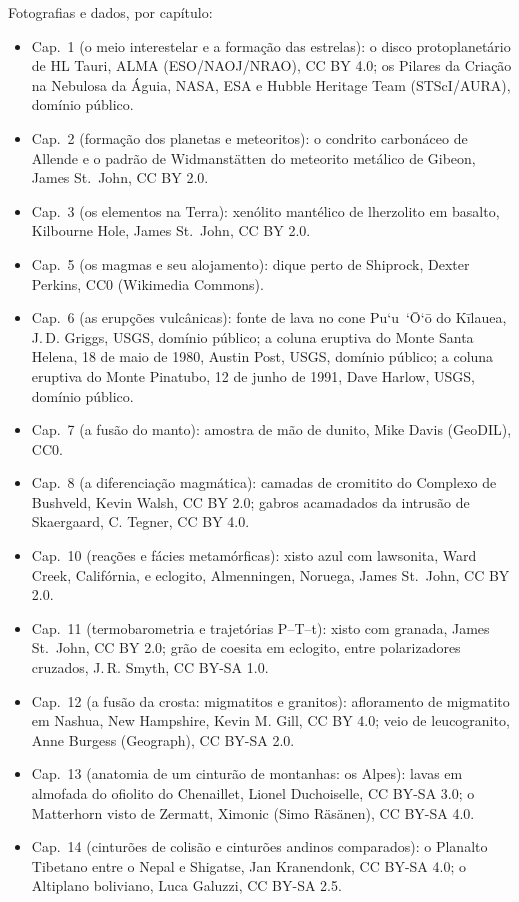 \bigskip
\noindent Fotografias e dados, por capítulo:
\begin{itemize}\small
  \item Cap.~1 (o meio interestelar e a formação das estrelas): o disco protoplanetário de HL Tauri, ALMA (ESO/NAOJ/NRAO), CC BY 4.0; os Pilares da Criação na Nebulosa da Águia, NASA, ESA e Hubble Heritage Team (STScI/AURA), domínio público.
  \item Cap.~2 (formação dos planetas e meteoritos): o condrito carbonáceo de Allende e o padrão de Widmanstätten do meteorito metálico de Gibeon, James St.~John, CC BY 2.0.
  \item Cap.~3 (os elementos na Terra): xenólito mantélico de lherzolito em basalto, Kilbourne Hole, James St.~John, CC BY 2.0.
  \item Cap.~5 (os magmas e seu alojamento): dique perto de Shiprock, Dexter Perkins, CC0 (Wikimedia Commons).
  \item Cap.~6 (as erupções vulcânicas): fonte de lava no cone Pu`u~`\=O`\=o do Kīlauea, J.\,D. Griggs, USGS, domínio público; a coluna eruptiva do Monte Santa Helena, 18 de maio de 1980, Austin Post, USGS, domínio público; a coluna eruptiva do Monte Pinatubo, 12 de junho de 1991, Dave Harlow, USGS, domínio público.
  \item Cap.~7 (a fusão do manto): amostra de mão de dunito, Mike Davis (GeoDIL), CC0.
  \item Cap.~8 (a diferenciação magmática): camadas de cromitito do Complexo de Bushveld, Kevin Walsh, CC BY 2.0; gabros acamadados da intrusão de Skaergaard, C. Tegner, CC BY 4.0.
  \item Cap.~10 (reações e fácies metamórficas): xisto azul com lawsonita, Ward Creek, Califórnia, e eclogito, Almenningen, Noruega, James St.~John, CC BY 2.0.
  \item Cap.~11 (termobarometria e trajetórias P--T--t): xisto com granada, James St.~John, CC BY 2.0; grão de coesita em eclogito, entre polarizadores cruzados, J.\,R. Smyth, CC BY-SA 1.0.
  \item Cap.~12 (a fusão da crosta: migmatitos e granitos): afloramento de migmatito em Nashua, New Hampshire, Kevin M. Gill, CC BY 4.0; veio de leucogranito, Anne Burgess (Geograph), CC BY-SA 2.0.
  \item Cap.~13 (anatomia de um cinturão de montanhas: os Alpes): lavas em almofada do ofiolito do Chenaillet, Lionel Duchoiselle, CC BY-SA 3.0; o Matterhorn visto de Zermatt, Ximonic (Simo Räsänen), CC BY-SA 4.0.
  \item Cap.~14 (cinturões de colisão e cinturões andinos comparados): o Planalto Tibetano entre o Nepal e Shigatse, Jan Kranendonk, CC BY-SA 4.0; o Altiplano boliviano, Luca Galuzzi, CC BY-SA 2.5.

\end{itemize}
